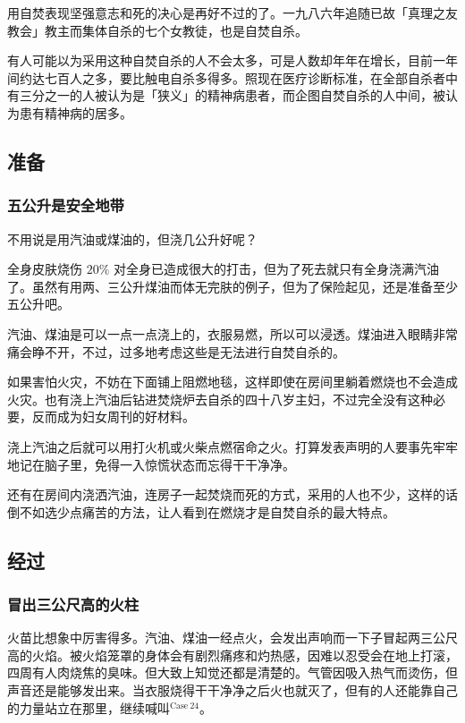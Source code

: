 \documentclass[UTF8]{ctexart}
\begin{document}
用自焚表现坚强意志和死的决心是再好不过的了。一九八六年追随已故「真理之友教会」教主而集体自杀的七个女教徒，也是自焚自杀。

有人可能以为采用这种自焚自杀的人不会太多，可是人数却年年在增长，目前一年间约达七百人之多，要比触电自杀多得多。照现在医疗诊断标准，在全部自杀者中有三分之一的人被认为是「狭义」的精神病患者，而企图自焚自杀的人中间，被认为患有精神病的居多。

\subsection{准备}

\subsubsection*{五公升是安全地带}

不用说是用汽油或煤油的，但浇几公升好呢？ 

全身皮肤烧伤 $20\%$ 对全身已造成很大的打击，但为了死去就只有全身浇满汽油了。虽然有用两、三公升煤油而体无完肤的例子，但为了保险起见，还是准备至少五公升吧。

汽油、煤油是可以一点一点浇上的，衣服易燃，所以可以浸透。煤油进入眼睛非常痛会睁不开，不过，过多地考虑这些是无法进行自焚自杀的。

如果害怕火灾，不妨在下面铺上阻燃地毯，这样即使在房间里躺着燃烧也不会造成火灾。也有浇上汽油后钻进焚烧炉去自杀的四十八岁主妇，不过完全没有这种必要，反而成为妇女周刊的好材料。

浇上汽油之后就可以用打火机或火柴点燃宿命之火。打算发表声明的人要事先牢牢地记在脑子里，免得一入惊慌状态而忘得干干净净。

还有在房间内浇洒汽油，连房子一起焚烧而死的方式，采用的人也不少，这样的话倒不如选少点痛苦的方法，让人看到在燃烧才是自焚自杀的最大特点。

\subsection{经过}

\subsubsection*{冒出三公尺高的火柱}

火苗比想象中厉害得多。汽油、煤油一经点火，会发出声响而一下子冒起两三公尺高的火焰。被火焰笼罩的身体会有剧烈痛疼和灼热感，因难以忍受会在地上打滚，四周有人肉烧焦的臭味。但大致上知觉还都是清楚的。气管因吸入热气而烫伤，但声音还是能够发出来。当衣服烧得干干净净之后火也就灭了，但有的人还能靠自己的力量站立在那里，继续喊叫$^{\mathrm{Case\ 24}}$。 
\end{document}
